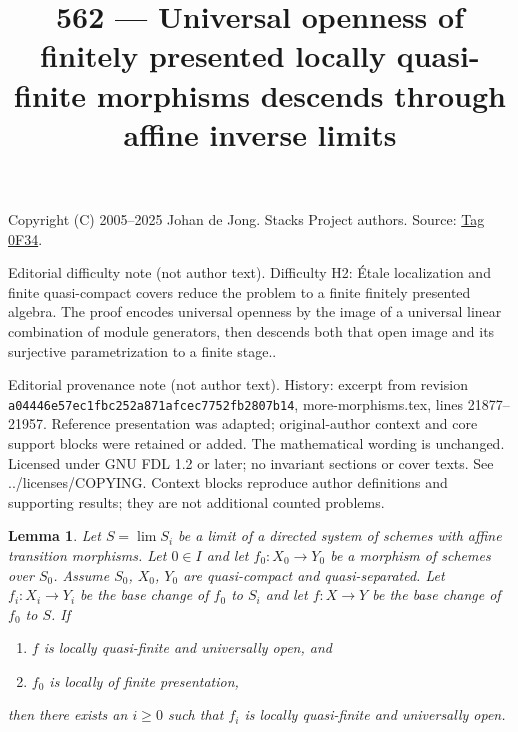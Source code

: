 \documentclass{amsart}
\theoremstyle{plain}
\newtheorem{lemma}[subsection]{Lemma}
\theoremstyle{definition}
\theoremstyle{remark}
\numberwithin{equation}{subsection}
\def\lim{\mathop{\mathrm{lim}}\nolimits}
\begin{document}
\title[Stacks Project, Tag 0F34]{562 --- Universal openness of finitely presented locally quasi-finite morphisms descends through affine inverse limits}
\maketitle
\noindent Copyright (C) 2005--2025 Johan de Jong. Stacks Project authors. Source: \href{https://stacks.math.columbia.edu/tag/0F34}{Tag 0F34}.

\noindent Editorial difficulty note (not author text). Difficulty H2: Étale localization and finite quasi-compact covers reduce the problem to a finite finitely presented algebra. The proof encodes universal openness by the image of a universal linear combination of module generators, then descends both that open image and its surjective parametrization to a finite stage..

\noindent Editorial provenance note (not author text). History: excerpt from revision \texttt{a0444\allowbreak 6e57e\allowbreak c1fbc\allowbreak 252a8\allowbreak 71afc\allowbreak ec775\allowbreak 2fb28\allowbreak 07b14}, more-morphisms.tex, lines 21877--21957. Reference presentation was adapted; original-author context and core support blocks were retained or added. The mathematical wording is unchanged. Licensed under GNU FDL 1.2 or later; no invariant sections or cover texts. See ../licenses/COPYING. Context blocks reproduce author definitions and supporting results; they are not additional counted problems.

\begin{lemma}
\label{lemma-descend-quasi-finite-universally-open}
Let $S = \lim S_i$ be a limit of a directed system of schemes
with affine transition morphisms.
Let $0 \in I$ and let $f_0 : X_0 \to Y_0$ be a morphism of schemes over $S_0$.
Assume $S_0$, $X_0$, $Y_0$ are quasi-compact and quasi-separated.
Let $f_i : X_i \to Y_i$ be the base change of $f_0$ to $S_i$ and
let $f : X \to Y$ be the base change of $f_0$ to $S$.
If
\begin{enumerate}
\item $f$ is locally quasi-finite and universally open, and
\item $f_0$ is locally of finite presentation,
\end{enumerate}
then there exists an $i \geq 0$ such that $f_i$ is locally quasi-finite
and universally open.
\end{lemma}
\end{document}

